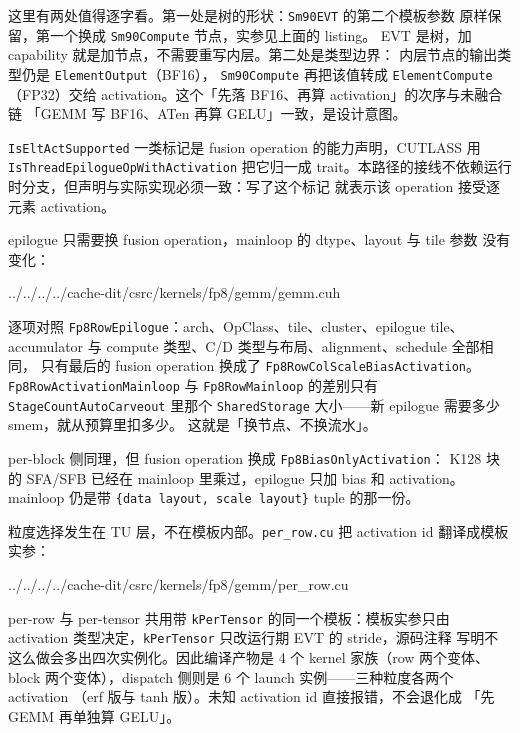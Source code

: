 这里有两处值得逐字看。第一处是树的形状：\texttt{Sm90EVT} 的第二个模板参数
原样保留，第一个换成 \texttt{Sm90Compute} 节点，实参见上面的 listing。
EVT 是树，加 capability 就是加节点，不需要重写内层。第二处是类型边界：
内层节点的输出类型仍是 \texttt{ElementOutput}（BF16），
\texttt{Sm90Compute} 再把该值转成 \texttt{ElementCompute}（FP32）交给
activation。这个「先落 BF16、再算 activation」的次序与未融合链
「GEMM 写 BF16、ATen 再算 GELU」一致，是设计意图。

\texttt{IsEltActSupported} 一类标记是 fusion operation 的能力声明，CUTLASS
用 \texttt{IsThreadEpilogueOp}\allowbreak\texttt{WithActivation} 把它归一成
trait。本路径的接线不依赖运行时分支，但声明与实际实现必须一致：写了这个标记
就表示该 operation 接受逐元素 activation。

epilogue 只需要换 fusion operation，mainloop 的 dtype、layout 与 tile 参数
没有变化：

\begin{lstinputlisting}[linerange={378-402},firstnumber=auto,
  title={cache-dit fp8/gemm/gemm.cuh L378--402（activation 版 collective 家族）}]{../../../../cache-dit/csrc/kernels/fp8/gemm/gemm.cuh}
\end{lstinputlisting}

逐项对照 \texttt{Fp8RowEpilogue}：arch、OpClass、tile、cluster、epilogue tile、
accumulator 与 compute 类型、C/D 类型与布局、alignment、schedule 全部相同，
只有最后的 fusion operation 换成了
\texttt{Fp8RowColScaleBias}\allowbreak\texttt{Activation}。
\texttt{Fp8RowActivationMainloop} 与 \texttt{Fp8RowMainloop} 的差别只有
\texttt{StageCountAuto}\allowbreak\texttt{Carveout} 里那个
\texttt{SharedStorage} 大小——新 epilogue 需要多少 smem，就从预算里扣多少。
这就是「换节点、不换流水」。

per-block 侧同理，但 fusion operation 换成 \texttt{Fp8BiasOnlyActivation}：
K128 块的 SFA/SFB 已经在 mainloop 里乘过，epilogue 只加 bias 和 activation。
mainloop 仍是带 \texttt{\{data layout, scale layout\}} tuple 的那一份。

粒度选择发生在 TU 层，不在模板内部。\texttt{per\_row.cu} 把 activation id
翻译成模板实参：

\begin{lstinputlisting}[linerange={14-27},firstnumber=auto,
  title={cache-dit fp8/gemm/per\_row.cu L14--27（activation id 到模板实参）}]{../../../../cache-dit/csrc/kernels/fp8/gemm/per_row.cu}
\end{lstinputlisting}

per-row 与 per-tensor 共用带 \texttt{kPerTensor} 的同一个模板：模板实参只由
activation 类型决定，\texttt{kPerTensor} 只改运行期 EVT 的 stride，源码注释
写明不这么做会多出四次实例化。因此编译产物是 4 个 kernel 家族（row 两个变体、
block 两个变体），dispatch 侧则是 6 个 launch 实例——三种粒度各两个 activation
（erf 版与 tanh 版）。未知 activation id 直接报错，不会退化成
「先 GEMM 再单独算 GELU」。

